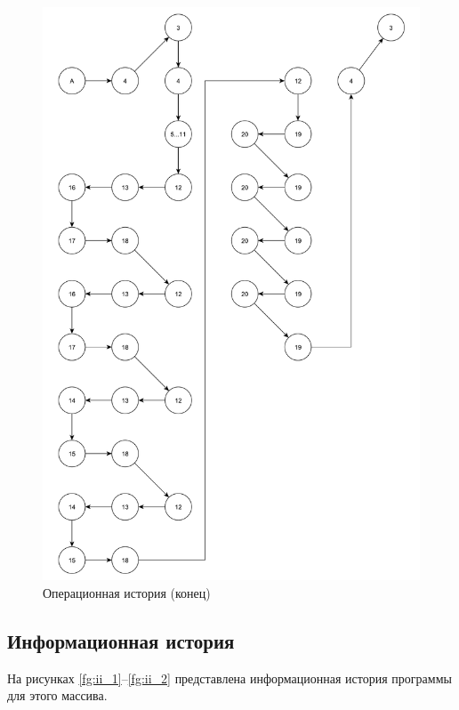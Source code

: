 \begin{figure}[h]
	\centering
	\includegraphics[height=0.9\textheight]{img/операционная_история_2.pdf}
	\caption{Операционная история (конец)}
	\label{fg:oi_2}
\end{figure}

\clearpage

\subsection{Информационная история}

На рисунках \ref{fg:ii_1}--\ref{fg:ii_2} представлена информационная история программы для этого массива.

